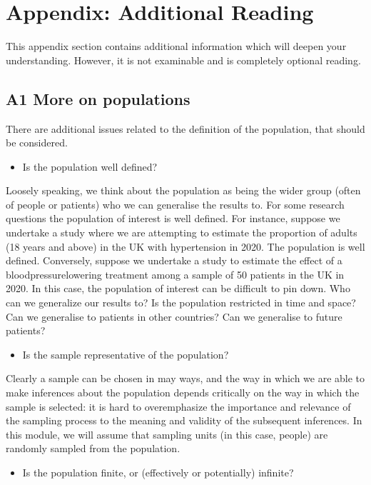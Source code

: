 \documentclass[letterpaper,10pt,english]{jupyterBook}
\begin{document}
\section{Appendix: Additional Reading}
\label{\detokenize{04.g. Population.and.samples:appendix-additional-reading}}\label{\detokenize{04.g. Population.and.samples::doc}}
\sphinxAtStartPar
This appendix section contains additional information which will deepen your understanding. However, it is not examinable and is completely optional reading.


\subsection{A1 More on populations}
\label{\detokenize{04.g. Population.and.samples:a1-more-on-populations}}
\sphinxAtStartPar
There are additional issues related to the definition of the population, that should be considered.
\begin{itemize}
\item {} 
\sphinxAtStartPar
Is the population well defined?

\end{itemize}

\sphinxAtStartPar
Loosely speaking, we think about the population as being the wider group (often of people or patients) who we can generalise the results to. For some research questions the population of interest is well defined. For instance, suppose we undertake a study where we are attempting to estimate the proportion of adults (18 years and above) in the UK with hypertension in 2020. The population is well defined. Conversely, suppose we undertake a study to estimate the effect of a blood\sphinxhyphen{}pressure\sphinxhyphen{}lowering treatment among a sample of 50 patients in the UK in 2020. In this case, the population of interest can be difficult to pin down. Who can we generalize our results to? Is the population restricted in time and space? Can we generalise to patients in other countries? Can we generalise to future patients?
\begin{itemize}
\item {} 
\sphinxAtStartPar
Is the sample representative of the population?

\end{itemize}

\sphinxAtStartPar
Clearly a sample can be chosen in may ways, and the way in which we are able to make inferences about the population depends critically on the way in which the sample is selected: it is hard to over\sphinxhyphen{}emphasize the importance and relevance of the sampling process to the meaning and validity of the subsequent inferences. In this module, we will assume that sampling units (in this case, people) are randomly sampled from the population.
\begin{itemize}
\item {} 
\sphinxAtStartPar
Is the population finite, or (effectively or potentially) infinite?

\end{itemize}
\end{document}
